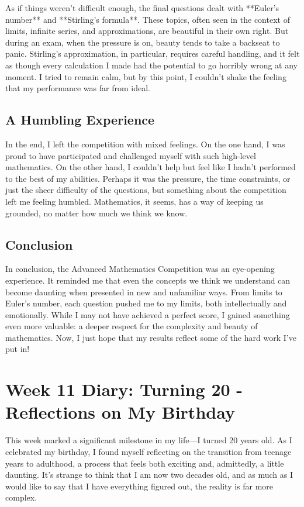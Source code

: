 \documentclass[a4paper]{article} 	%
\begin{document}
As if things weren’t difficult enough, the final questions dealt with **Euler’s number** and **Stirling’s formula**. These topics, often seen in the context of limits, infinite series, and approximations, are beautiful in their own right. But during an exam, when the pressure is on, beauty tends to take a backseat to panic. Stirling’s approximation, in particular, requires careful handling, and it felt as though every calculation I made had the potential to go horribly wrong at any moment. I tried to remain calm, but by this point, I couldn’t shake the feeling that my performance was far from ideal.

\subsection*{A Humbling Experience}

In the end, I left the competition with mixed feelings. On the one hand, I was proud to have participated and challenged myself with such high-level mathematics. On the other hand, I couldn’t help but feel like I hadn’t performed to the best of my abilities. Perhaps it was the pressure, the time constraints, or just the sheer difficulty of the questions, but something about the competition left me feeling humbled. Mathematics, it seems, has a way of keeping us grounded, no matter how much we think we know.

\subsection*{Conclusion}

In conclusion, the Advanced Mathematics Competition was an eye-opening experience. It reminded me that even the concepts we think we understand can become daunting when presented in new and unfamiliar ways. From limits to Euler’s number, each question pushed me to my limits, both intellectually and emotionally. While I may not have achieved a perfect score, I gained something even more valuable: a deeper respect for the complexity and beauty of mathematics. Now, I just hope that my results reflect some of the hard work I’ve put in!

\section{Week 11 Diary: Turning 20 - Reflections on My Birthday}

This week marked a significant milestone in my life—I turned 20 years old. As I celebrated my birthday, I found myself reflecting on the transition from teenage years to adulthood, a process that feels both exciting and, admittedly, a little daunting. It’s strange to think that I am now two decades old, and as much as I would like to say that I have everything figured out, the reality is far more complex.
\end{document}
